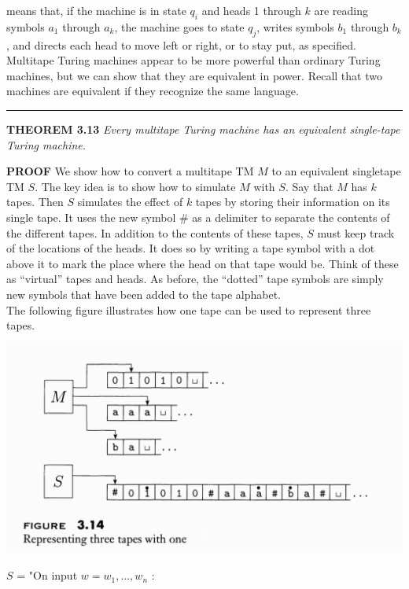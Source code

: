 \documentclass[main.tex]{subfiles}
\begin{document}
means that, if the machine is in state $q_i$ and heads 1 through $k$ are reading symbols $a_1$ through $a_k$, the machine goes to state $q_j$, writes symbols $b_1$ through $b_k$,
and directs each head to move left or right, or to stay put, as specified.
Multitape Turing machines appear to be more powerful than ordinary Turing
machines, but we can show that they are equivalent in power. Recall that two
machines are equivalent if they recognize the same language. 
\par\rule{\textwidth}{0.4pt}
\textbf{THEOREM 3.13} \textit{Every multitape Turing machine has an equivalent single-tape Turing machine.}
\par\textbf{PROOF} We show how to convert a multitape TM $M$ to an equivalent singletape TM $S$. The key idea is to show how to simulate $M$ with $S$.
Say that $M$ has $k$ tapes. Then $S$ simulates the effect of $k$ tapes by storing
their information on its single tape. It uses the new symbol \# as a delimiter to
separate the contents of the different tapes. In addition to the contents of these
tapes, $S$ must keep track of the locations of the heads. It does so by writing a tape
symbol with a dot above it to mark the place where the head on that tape would
be. Think of these as “virtual” tapes and heads. As before, the “dotted” tape
symbols are simply new symbols that have been added to the tape alphabet.\\
The following figure illustrates how one tape can be used to represent three tapes. 
\begin{center}
    \includegraphics[scale=0.47]{images/figure314.png}
\end{center}
$S$ = "On input $w = w_1, ..., w_n$ :
\end{document}
